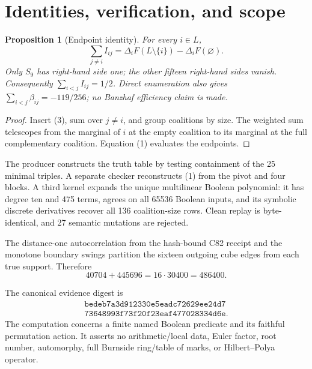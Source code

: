 \documentclass[10pt]{article}
\newtheorem{proposition}{Proposition}
\newcommand{\cF}{F}
\newcommand{\cL}{L}
\begin{document}
\section{Identities, verification, and scope}
\begin{proposition}[Endpoint identity]
For every $i\in\cL$,
\[
 \sum_{j\ne i}I_{ij}
 =\Delta_i\cF(\cL\setminus\{i\})-\Delta_i\cF(\varnothing).
 \tag{4}
\]
Only $S_9$ has right-hand side one; the other fifteen right-hand sides vanish.
Consequently $\sum_{i<j}I_{ij}=1/2$.  Direct enumeration also gives
$\sum_{i<j}\beta_{ij}=-119/256$; no Banzhaf efficiency claim is made.
\end{proposition}
\begin{proof}
Insert (3), sum over $j\ne i$, and group coalitions by size.  The weighted
sum telescopes from the marginal of $i$ at the empty coalition to its marginal
at the full complementary coalition.  Equation (1) evaluates the endpoints.
\end{proof}

The producer constructs the truth table by testing containment of the 25
minimal triples.  A separate checker reconstructs (1) from the pivot and four
blocks.  A third kernel expands the unique multilinear Boolean polynomial:
it has degree ten and 475 terms, agrees on all 65536 Boolean inputs, and its
symbolic discrete derivatives recover all 136 coalition-size rows.  Clean
replay is byte-identical, and 27 semantic mutations are rejected.

The distance-one autocorrelation from the hash-bound C82 receipt and the
monotone boundary swings partition the sixteen outgoing cube edges from each
true support.  Therefore
\[
 40704+445696=16\cdot30400=486400.
 \tag{5}
\]

The canonical evidence digest is
\[
\begin{gathered}
\texttt{bedeb7a3d912330e5eadc72629ee24d7}\\[-2pt]
\texttt{73648993f73f20f23eaf477028334d6e}.
\end{gathered}
\]
The computation concerns a finite named Boolean predicate and its faithful
permutation action.  It asserts no arithmetic/local data, Euler factor, root
number, automorphy, full Burnside ring/table of marks, or Hilbert--Polya
operator.
\end{document}
